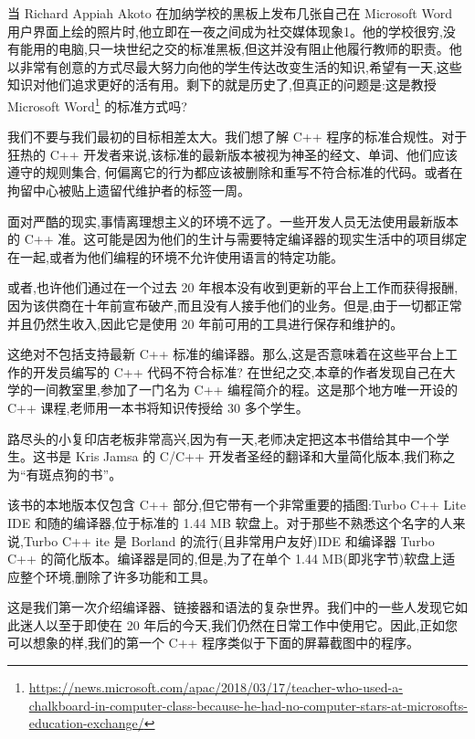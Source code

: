 当 Richard Appiah Akoto 在加纳学校的黑板上发布几张自己在 Microsoft Word 用户界面上绘的照片时,他立即在一夜之间成为社交媒体现象1。他的学校很穷,没有能用的电脑,只一块世纪之交的标准黑板,但这并没有阻止他履行教师的职责。他以非常有创意的方式尽最大努力向他的学生传达改变生活的知识,希望有一天,这些知识对他们追求更好的活有用。剩下的就是历史了,但真正的问题是:这是教授 Microsoft Word\footnote{\url{https://news.microsoft.com/apac/2018/03/17/teacher-who-used-a-chalkboard-in-computer-class-because-he-had-no-computer-stars-at-microsofts-education-exchange/}} 的标准方式吗?

我们不要与我们最初的目标相差太大。我们想了解 C++ 程序的标准合规性。对于狂热的 C++ 开发者来说,该标准的最新版本被视为神圣的经文、单词、他们应该遵守的规则集合, 何偏离它的行为都应该被删除和重写不符合标准的代码。或者在拘留中心被贴上遗留代维护者的标签一周。

面对严酷的现实,事情离理想主义的环境不远了。一些开发人员无法使用最新版本的 C++ 准。这可能是因为他们的生计与需要特定编译器的现实生活中的项目绑定在一起,或者为他们编程的环境不允许使用语言的特定功能。

或者,也许他们通过在一个过去 20 年根本没有收到更新的平台上工作而获得报酬,因为该供商在十年前宣布破产,而且没有人接手他们的业务。但是,由于一切都正常并且仍然生收入,因此它是使用 20 年前可用的工具进行保存和维护的。

这绝对不包括支持最新 C++ 标准的编译器。那么,这是否意味着在这些平台上工作的开发员编写的 C++ 代码不符合标准? 在世纪之交,本章的作者发现自己在大学的一间教室里,参加了一门名为 C++ 编程简介的程。这是那个地方唯一开设的 C++ 课程,老师用一本书将知识传授给 30 多个学生。

路尽头的小复印店老板非常高兴,因为有一天,老师决定把这本书借给其中一个学生。这书是 Kris Jamsa 的 C/C++ 开发者圣经的翻译和大量简化版本,我们称之为“有斑点狗的书”。

该书的本地版本仅包含 C++ 部分,但它带有一个非常重要的插图:Turbo C++ Lite IDE 和随的编译器,位于标准的 1.44 MB 软盘上。对于那些不熟悉这个名字的人来说,Turbo C++ ite 是 Borland 的流行(且非常用户友好)IDE 和编译器 Turbo C++ 的简化版本。编译器是同的,但是,为了在单个 1.44 MB(即兆字节)软盘上适应整个环境,删除了许多功能和工具。

这是我们第一次介绍编译器、链接器和语法的复杂世界。我们中的一些人发现它如此迷人以至于即使在 20 年后的今天,我们仍然在日常工作中使用它。因此,正如您可以想象的样,我们的第一个 C++ 程序类似于下面的屏幕截图中的程序。



